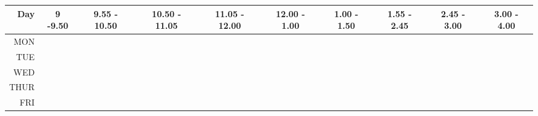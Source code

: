 \documentclass[a4paper,12ptx]{article}
\begin{document}
	
\begin{tabular}{|r|c|c|c|c|c|c|c|c|c}
\hline
Day & 9 -9.50 & 9.55 - 10.50 & 10.50 - 11.05 & 11.05 - 12.00 & 12.00 - 1.00 & 1.00 - 1.50 & 1.55 - 2.45 & 2.45 - 3.00 & 3.00 - 4.00 \\
\hline
MON & & & & & & & & & \\
\hline
TUE & & & & & & & & & \\
\hline
WED & & & & & & & & & \\
\hline
THUR & & & & & & & & & \\
\hline
FRI & & & & & & & & & \\
\hline
\end{tabular}
\end{document}
